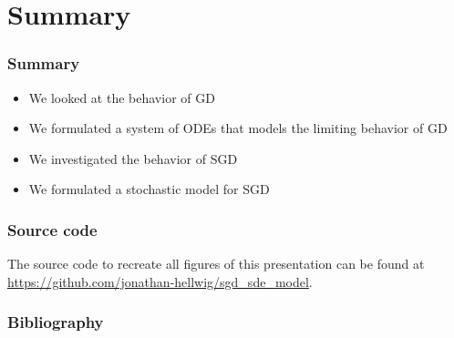 \documentclass[17pt,institute=e10]{tuhh_presentation}
\begin{document}
\section{Summary}
\begin{frame}
  \frametitle{Summary}
  \begin{itemize}
    \item We looked at the behavior of GD
    \item We formulated a system of ODEs that models the limiting behavior of GD
    \item We investigated the behavior of SGD
    \item We formulated a stochastic model for SGD
  \end{itemize}
  \end{frame}
\begin{frame}
  \frametitle{Source code}
  The source code to recreate all figures of this presentation can be found at \url{https://github.com/jonathan-hellwig/sgd_sde_model}.
\end{frame}
\begin{frame}
  \frametitle{Bibliography}
\printbibliography
\end{frame}
\end{document}
